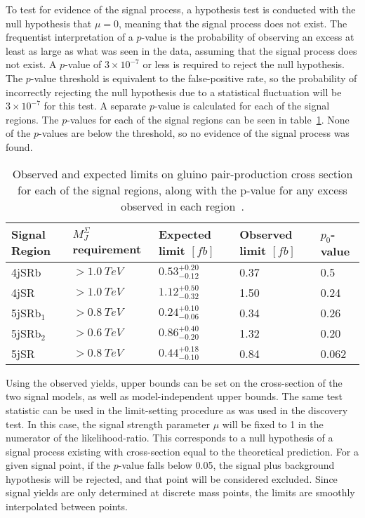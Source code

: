 To test for evidence of the signal process, a hypothesis test is conducted with the null hypothesis that $\mu=0$, meaning that the signal process does not exist.
The frequentist interpretation of a $p$-value is the probability of observing an excess at least as large as what was seen in the data, assuming that the signal process does not exist.
A $p$-value of $3\times10^{-7}$ or less is required to reject the null hypothesis.
The $p$-value threshold is equivalent to the false-positive rate, so the probability of incorrectly rejecting the null hypothesis due to a statistical fluctuation will be $3\times10^{-7}$ for this test.
A separate $p$-value is calculated for each of the signal regions.
The $p$-values for each of the signal regions can be seen in table~\ref{tbl:results_model_ind_limits}.
None of the $p$-values are below the threshold, so no evidence of the signal process was found.

\begin{table}[!ht]
    \centering

    \begin{tabular}{lllll}
        \toprule
        Signal Region & $M_{J}^{\Sigma}$ requirement & Expected limit $[fb]$  & Observed limit $[fb]$ & $p_0$-value \\
        \midrule
        4jSRb           & $>1.0~TeV$                      & $0.53^{+0.20}_{-0.12}$ & 0.37 & 0.5   \\
        4jSR            & $>1.0~TeV$                      & $1.12^{+0.50}_{-0.32}$ & 1.50 & 0.24  \\
        5jSRb$_1$       & $>0.8~TeV$                      & $0.24^{+0.10}_{-0.06}$ & 0.34 & 0.26  \\
        5jSRb$_2$       & $>0.6~TeV$                      & $0.86^{+0.40}_{-0.20}$ & 1.32 & 0.20  \\
        5jSR            & $>0.8~TeV$                      & $0.44^{+0.18}_{-0.10}$ & 0.84 & 0.062 \\
        \bottomrule
    \end{tabular}

    \caption{Observed and expected limits on gluino pair-production cross section for each of the signal regions,
    along with the p-value for any excess observed in each region~\cite{paper-plb}.}
\label{tbl:results_model_ind_limits}
\end{table}

Using the observed yields, upper bounds can be set on the cross-section of the two signal models, as well as model-independent upper bounds.
The same test statistic can be used in the limit-setting procedure as was used in the discovery test.
In this case, the signal strength parameter $\mu$ will be fixed to 1 in the numerator of the likelihood-ratio.
This corresponds to a null hypothesis of a signal process existing with cross-section equal to the theoretical prediction.
For a given signal point, if the $p$-value falls below 0.05, the signal plus background hypothesis will be rejected, and that point will be considered excluded.
Since signal yields are only determined at discrete mass points, the limits are smoothly interpolated between points.

